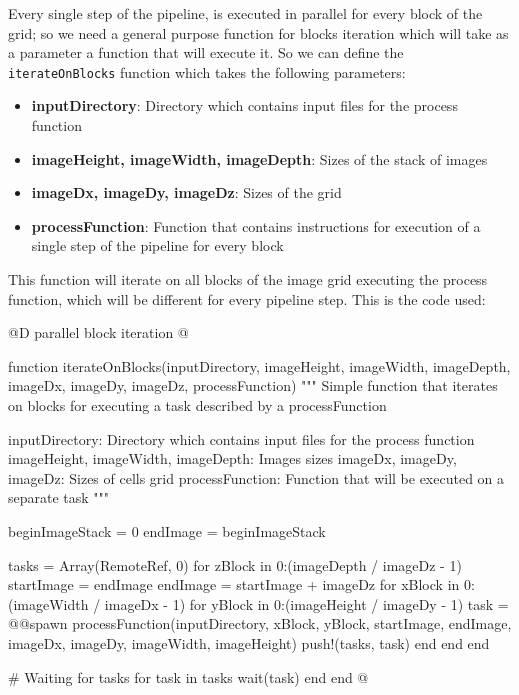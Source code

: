 \documentclass[11pt,oneside]{article}	%
\begin{document}
Every single step of the pipeline, is executed in parallel for every block of the grid; so we need a general purpose function for blocks iteration which will take as a parameter a function that will execute it. So we can define the \texttt{iterateOnBlocks} function which takes the following parameters:
\begin{itemize}
 \item \textbf{inputDirectory}: Directory which contains input files for the process function
 \item \textbf{imageHeight, imageWidth, imageDepth}: Sizes of the stack of images
 \item \textbf{imageDx, imageDy, imageDz}: Sizes of the grid
 \item \textbf{processFunction}: Function that contains instructions for execution of a single step of the pipeline for every block
\end{itemize}

This function will iterate on all blocks of the image grid executing the process function, which will be different for every pipeline step. This is the code used:

@D parallel block iteration
@{function iterateOnBlocks(inputDirectory,
                         imageHeight, imageWidth, imageDepth,
                         imageDx, imageDy, imageDz,
                         processFunction)
  """
  Simple function that iterates on blocks for executing
  a task described by a processFunction

  inputDirectory: Directory which contains input files for the process function
  imageHeight, imageWidth, imageDepth: Images sizes
  imageDx, imageDy, imageDz: Sizes of cells grid
  processFunction: Function that will be executed on a separate task
  """

  beginImageStack = 0
  endImage = beginImageStack

  tasks = Array(RemoteRef, 0)
  for zBlock in 0:(imageDepth / imageDz - 1)
    startImage = endImage
    endImage = startImage + imageDz
    for xBlock in 0:(imageWidth / imageDx - 1)
      for yBlock in 0:(imageHeight / imageDy - 1)
        task = @@spawn processFunction(inputDirectory,
                                      xBlock, yBlock,
                                      startImage, endImage,
                                      imageDx, imageDy,
                                      imageWidth, imageHeight)
        push!(tasks, task)
      end
    end
  end

  # Waiting for tasks
  for task in tasks
    wait(task)
  end
end @}
\end{document}
